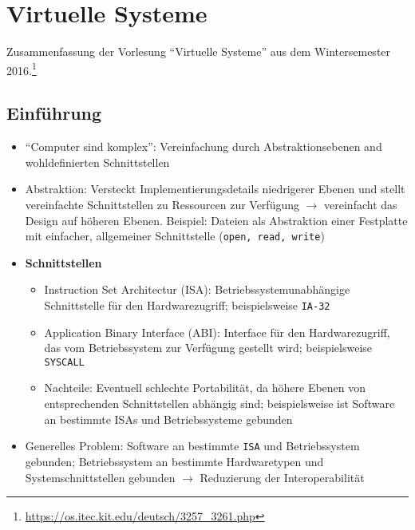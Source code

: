 \chapter{Virtuelle Systeme}

Zusammenfassung der Vorlesung "`Virtuelle Systeme"' aus dem Wintersemester 2016.\footnote{\url{https://os.itec.kit.edu/deutsch/3257_3261.php}}

\section{Einführung}
\begin{itemize}
	\item "`Computer sind komplex"': Vereinfachung durch Abstraktionsebenen and wohldefinierten Schnittstellen
	\item Abstraktion: Versteckt Implementierungsdetails niedrigerer Ebenen und stellt vereinfachte Schnittstellen zu Ressourcen zur Verfügung \(\rightarrow\) vereinfacht das Design auf höheren Ebenen. Beispiel: Dateien als Abstraktion einer Festplatte mit einfacher, allgemeiner Schnittstelle (\texttt{open, read, write})
	\item \textbf{Schnittstellen}
	\begin{itemize}
		\item Instruction Set Architectur (ISA): Betriebssystemunabhängige Schnittstelle für den Hardwarezugriff; beispielsweise \texttt{IA-32}
		\item Application Binary Interface (ABI): Interface für den Hardwarezugriff, das vom Betriebssystem zur Verfügung gestellt wird; beispielsweise \texttt{SYSCALL}
		\item Nachteile: Eventuell schlechte Portabilität, da höhere Ebenen von entsprechenden Schnittstellen abhängig sind; beispielsweise ist Software an bestimmte ISAs und Betriebssysteme gebunden
	\end{itemize}
	\item Generelles Problem: Software an bestimmte \texttt{ISA} und Betriebssystem gebunden; Betriebssystem an bestimmte Hardwaretypen und Systemschnittstellen gebunden \(\rightarrow\) Reduzierung der Interoperabilität
\end{itemize}


